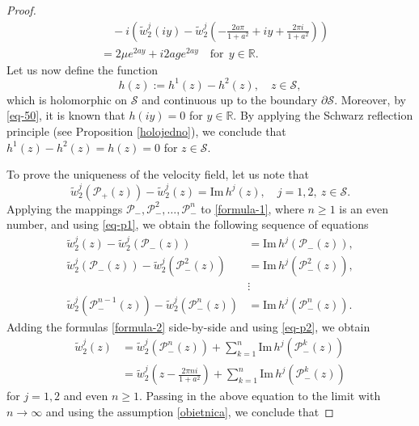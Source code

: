 \documentclass[10pt,a4paper]{amsart}
\def\PP{\mathcal{P}}
\def\R{\mathbb{R}}
\def\SS{\mathcal{S}}
\begin{document}
\begin{proof}
\begin{equation}
\begin{aligned}
&\quad - i \left(\tilde{w}_{2}^j(iy) - \tilde{w}_{2}^j\left(-\frac{2a\pi}{1+a^2}+ iy + \frac{2\pi i}{1+a^2}\right)\right) \\
&= 2\mu e^{2ay} +i 2a g e^{2ay} \quad \text{for} \ \ y\in\R.
\end{aligned}
\end{equation}
Let us now define the function
\begin{equation*}
h(z) := h^1(z) - h^2(z), \quad z\in\SS,
\end{equation*}
which is holomorphic on $\SS$ and continuous up to the boundary $\partial\SS$. Moreover, by \eqref{eq-50}, it is known that $h(iy) = 0$ for $y\in\R$. By applying the Schwarz reflection principle (see Proposition \ref{holojedno}), we conclude that $h^1(z) - h^2(z) = h(z)=0$ for $z\in\SS$. 

To prove the uniqueness of the velocity field, let us note that
\begin{equation}\label{formula-1}
\tilde{w}_{2}^j(\PP_{+}(z)) - \tilde{w}_{2}^j(z) = \mathrm{Im}\,h^{j}(z), \quad j=1,2, \ z\in\SS. 
\end{equation}
Applying the mappings $\PP_{-}, \PP_{-}^{2}, \ldots, \PP_{-}^{n}$ to \eqref{formula-1}, where $n\ge 1$ is an even number, and using \eqref{eq-p1}, we obtain the following sequence of equations
\begin{equation}
\begin{aligned}\label{formula-2}
\tilde{w}_{2}^j(z) - \tilde{w}_{2}^j(\PP_{-}(z)) & = \mathrm{Im}\, h^j(\PP_{-}(z)), \\
\tilde{w}_{2}^j(\PP_{-}(z)) - \tilde{w}_{2}^j(\PP_{-}^{2}(z)) & = \mathrm{Im}\, h^j(\PP_{-}^{2}(z)), \\
& \vdots \\
\tilde{w}_{2}^j(\PP_{-}^{n-1}(z)) - \tilde{w}_{2}^j(\PP_{-}^{n}(z)) & = \mathrm{Im}\, h^j(\PP_{-}^{n}(z)).
\end{aligned}
\end{equation}
Adding the formulas \eqref{formula-2} side-by-side and using \eqref{eq-p2}, we obtain
\begin{equation*}
\begin{aligned}
\tilde{w}_{2}^j(z) & = \tilde{w}_{2}^j(\PP_{-}^{n}(z)) + \sum_{k=1}^{n}\mathrm{Im}\, h^j(\PP_{-}^{k}(z)) \\
& = \tilde{w}_{2}^j\left(z - \frac{2\pi n i}{1+a^2}\right) + \sum_{k=1}^{n}\mathrm{Im}\, h^j(\PP_{-}^{k}(z))
\end{aligned}
\end{equation*}
for $j=1,2$ and even $n\ge 1$. Passing in the above equation to the limit with $n\to \infty$ and using the assumption \eqref{obietnica}, we conclude that 

\end{proof}
\end{document}
